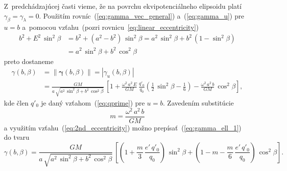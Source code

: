 \documentclass[a4paper,12pt]{book}
\begin{document}
Z~predchádzajúcej časti vieme, že na povrchu ekvipotenciálneho elipsoidu platí 
$\gamma_\beta = \gamma_\lambda = 0$.  Použitím 
rovníc~(\ref{eq:gamma_vec_general}) a~(\ref{eq:gamma_u}) pre $u = b$ a~pomocou 
vzťahu~(pozri rovnicu~\ref{eq:linear_eccentricity})
%
\begin{equation}
\begin{split}
b^2 + E^2 \, \sin^2\beta &= b^2 + (a^2 - b^2) \, \sin^2\beta = a^2 \, 
\sin^2\beta + b^2 \, (1 - \sin^2\beta)\\
%
&= a^2 \, \sin^2\beta + b^2 \, \cos^2\beta
\end{split}
\end{equation}
%
preto dostaneme
%
\begin{equation}
\label{eq:gamma_ell_1}
\begin{split}
\gamma(b, \beta) &= \| \boldsymbol \gamma(b, \beta) \| = | \gamma_u(b, \beta) 
|\\
%
&= \frac{GM}{a \, \sqrt{a^2 \, \sin^2\beta + b^2 \, \cos^2\beta}} \, \left[ 
1 + \frac{\omega^2 \, a^2 \, E}{GM} \, \frac{q'_0}{q_0} \left( \frac{1}{2} \, 
\sin^2\beta - \frac{1}{6} \right) - \frac{\omega^2 \, a^2 \, b}{GM} \, 
\cos^2\beta \right]
{,}
\end{split}
\end{equation}
%
kde člen $q'_0$ je daný vzťahom~(\ref{eq:qprime}) pre $u = b$.  Zavedením 
substitúcie
%
\begin{equation}
m = \frac{\omega^2 \, a^2 \, b}{GM}
\end{equation}
%
a využitím vzťahu~(\ref{eq:2nd_eccentricity}) možno 
prepísať~(\ref{eq:gamma_ell_1}) do tvaru
%
\begin{equation}
\label{eq:gamma_ell_2}
\gamma(b, \beta) = \frac{GM}{a \, \sqrt{a^2 \, \sin^2\beta + b^2 \, 
\cos^2\beta}} \, \left[ \left( 1 + \frac{m}{3} \, \frac{e' \, q'_0}{q_0} 
\right) \, \sin^2\beta + \left( 1 - m - \frac{m}{6} \, \frac{e' \, q'_0}{q_0} 
\right) \, \cos^2\beta
\right]{.}
\end{equation}
\end{document}
